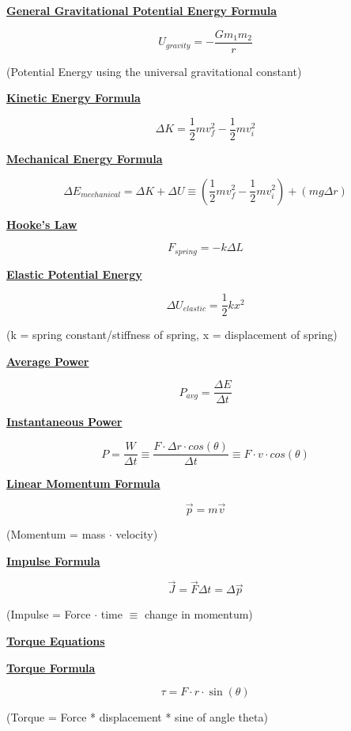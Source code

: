 \documentclass[12pt, letterpaper]{article}
\begin{document}
\normalsize{\centerline{\textbf{\underline{General Gravitational Potential Energy Formula}}}}
\[U_{gravity} = - \frac{G m_1 m_2}{r}\]
\small{\centerline{(Potential Energy using the universal gravitational constant)}}
\vspace{0.1em}

\normalsize{\centerline{\textbf{\underline{Kinetic Energy Formula}}}}
\[\Delta K = \frac{1}{2}mv^2_f - \frac{1}{2}mv^2_i\]

\normalsize{\centerline{\textbf{\underline{Mechanical Energy Formula}}}}
\[\Delta E_{mechanical} = \Delta K + \Delta U \equiv (\frac{1}{2}mv^2_f - \frac{1}{2}mv^2_i) + (mg \Delta r)\]

\normalsize{\centerline{\textbf{\underline{Hooke's Law}}}}
\[F_{spring} = -k \Delta L\]

\normalsize{\centerline{\textbf{\underline{Elastic Potential Energy}}}}
\[\Delta U_{elastic} = \frac{1}{2}kx^2\]
\small{\centerline{(k = spring constant/stiffness of spring, x = displacement of spring)}}
\vspace{0.1em}

\newpage

\normalsize{\centerline{\textbf{\underline{Average Power}}}}
\[P_{avg} = \frac{\Delta E}{\Delta t}\]

\normalsize{\centerline{\textbf{\underline{Instantaneous Power}}}}
\[P = \frac{W}{\Delta t} \equiv \frac{F \cdot \Delta r \cdot cos(\theta)}{\Delta t} \equiv F \cdot v \cdot cos(\theta)\]
\vspace{0.1em}

\normalsize{\centerline{\textbf{\underline{Linear Momentum Formula}}}}
\[\vec{p} = m \vec{v}\]
\small{\centerline{(Momentum = mass $\cdot$ velocity)}}
\vspace{0.1em}

\normalsize{\centerline{\textbf{\underline{Impulse Formula}}}}
\[\vec{J} = \vec{F} \Delta t = \Delta \vec{p}\]
\small{\centerline{(Impulse = Force $\cdot$ time $\equiv$ change in momentum)}}
\vspace{0.1em}

\newpage

\Large{\centerline{\textbf{\underline{Torque Equations}}}}
\vspace{1em}

\normalsize{\centerline{\textbf{\underline{Torque Formula}}}}
\[\tau = F \cdot r \cdot \sin (\theta)\]
\small{\centerline{(Torque = Force * displacement * sine of angle theta)}}
\end{document}
